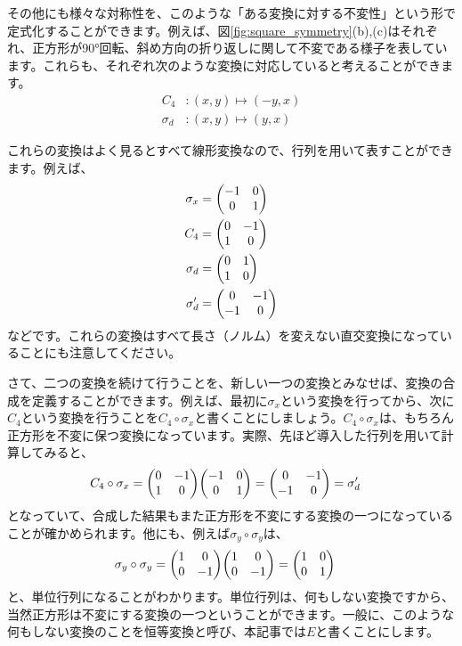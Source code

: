 \documentclass[uplatex,dvipdfmx,a4j,openany]{jsarticle}
\begin{document}
その他にも様々な対称性を、このような「ある変換に対する不変性」という形で定式化することができます。例えば、図\ref{fig:square_symmetry}(b),(c)はそれぞれ、正方形が90°回転、斜め方向の折り返しに関して不変である様子を表しています。これらも、それぞれ次のような変換に対応していると考えることができます。
\begin{align}
	C_4&: (x,y)\mapsto (-y,x)\\
	\sigma_d&: (x,y) \mapsto (y,x)
\end{align}

これらの変換はよく見るとすべて線形変換なので、行列を用いて表すことができます。例えば、
\begin{align}
	\sigma_x &= \mqty(-1 & 0 \\
					   0 & 1 ) \\
	C_4 &= \mqty(0 & -1 \\
				 1 & 0 )\\
	\sigma_d &= \mqty(0 & 1 \\
					1 & 0) \\
	\sigma_d' &= \mqty(0 & -1 \\
					  -1 & 0)
\end{align}
などです。これらの変換はすべて長さ（ノルム）を変えない直交変換になっていることにも注意してください。

さて、二つの変換を続けて行うことを、新しい一つの変換とみなせば、変換の合成を定義することができます。例えば、最初に$\sigma_x$という変換を行ってから、次に$C_4$という変換を行うことを$C_4 \circ \sigma_x$と書くことにしましょう。$C_4\circ \sigma_x$は、もちろん正方形を不変に保つ変換になっています。実際、先ほど導入した行列を用いて計算してみると、
\begin{align}
	C_4\circ \sigma_x &= 
	\mqty(	0	& -1 \\
		  	1	& 0 )
	\mqty(	-1	& 0 \\
			0	& 1 ) = 
	\mqty(	0	& -1 \\
			-1	& 0 ) = \sigma_d'
\end{align}
となっていて、合成した結果もまた正方形を不変にする変換の一つになっていることが確かめられます。他にも、例えば$\sigma_y\circ\sigma_y$は、
\begin{align}
	\sigma_y\circ\sigma_y &= 
	\mqty(	1	& 0 \\
			0	& -1 ) 
	\mqty(	1	& 0 \\
			0	& -1 ) = \mqty(\imat{2}) 		 
\end{align}
と、単位行列になることがわかります。単位行列は、何もしない変換ですから、当然正方形は不変にする変換の一つということができます。一般に、このような何もしない変換のことを恒等変換と呼び、本記事では$E$と書くことにします。
\end{document}
